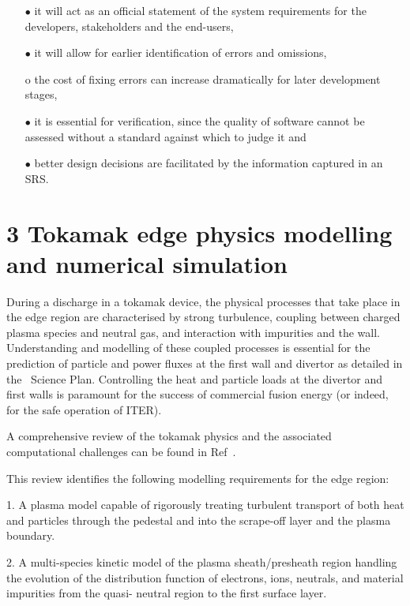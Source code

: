 \documentclass{article}
\begin{document}
\begin{itemize}
\item[$\bullet$] it will act as an official statement of the system requirements for the developers, 
stakeholders and the end-users,

\item[$\bullet$] it will allow for earlier identification of errors and omissions,

o the cost of fixing errors can increase dramatically for later development stages,

\item[$\bullet$] it is essential for verification, since the quality of software cannot be assessed 
without a standard against which to judge it and

\item[$\bullet$] better design decisions are facilitated by the information captured in an SRS.
\end{itemize}

\section*{{\Large{}{ \textbf{3 Tokamak edge physics modelling and 
numerical simulation}}}}

During a discharge in a tokamak device, the physical processes that take place 
in the edge region are characterised by strong turbulence, coupling between charged 
plasma species and neutral gas, and interaction with impurities and the wall. Understanding 
and modelling of these coupled processes is essential for the prediction of particle 
and power fluxes at the first wall and divertor as detailed in the \exc \   Science 
Plan. Controlling the heat and particle loads at the divertor and first walls is 
paramount for the success of commercial fusion energy (or indeed, for the safe 
operation of ITER).

A comprehensive review of the tokamak physics and the associated computational 
challenges can be found in Ref~\cite{ref [6]}.

This review identifies the following modelling requirements for the edge region:

{ 1. A plasma model capable of rigorously treating turbulent transport 
of both heat and particles through the pedestal and into the scrape-off layer and 
the plasma boundary.}

{ 2. A multi-species kinetic model of the plasma sheath/presheath 
region handling the evolution of the distribution function of electrons, ions, 
neutrals, and material impurities from the quasi- neutral region to the first surface 
layer.}
\end{document}
